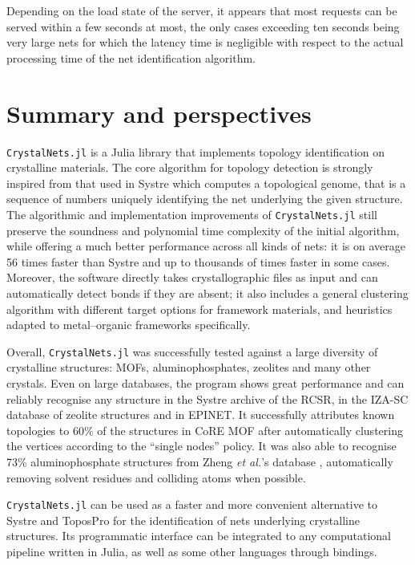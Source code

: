 \documentclass[main.tex]{subfiles}
\begin{document}
Depending on the load state of the server, it appears that most requests can be served within a few seconds at most, the only cases exceeding ten seconds being very large nets for which the latency time is negligible with respect to the actual processing time of the net identification algorithm.

\section{Summary and perspectives}

\texttt{CrystalNets.jl} is a Julia library that implements topology identification on crystalline materials. The core algorithm for topology detection is strongly inspired from that used in Systre \autocite{Systre} which computes a topological genome, that is a sequence of numbers uniquely identifying the net underlying the given structure. The algorithmic and implementation improvements of \texttt{CrystalNets.jl} still preserve the soundness and polynomial time complexity of the initial algorithm, while offering a much better performance across all kinds of nets: it is on average 56 times faster than Systre and up to thousands of times faster in some cases. Moreover, the software directly takes crystallographic files as input and can automatically detect bonds if they are absent; it also includes a general clustering algorithm with different target options for framework materials, and heuristics adapted to metal--organic frameworks specifically.

Overall, \texttt{CrystalNets.jl} was successfully tested against a large diversity of crystalline structures: MOFs, aluminophosphates, zeolites and many other crystals. Even on large databases, the program shows great performance and can reliably recognise any structure in the Systre archive of the RCSR, in the IZA-SC database of zeolite structures and in EPINET. It successfully attributes known topologies to {60\%} of the structures in CoRE MOF after automatically clustering the vertices according to the ``single nodes'' policy. It was also able to recognise {73\%} aluminophosphate structures from Zheng \textit{et al.}'s database \autocite{ALPO}, automatically removing solvent residues and colliding atoms when possible.

\texttt{CrystalNets.jl} can be used as a faster and more convenient alternative to Systre and ToposPro for the identification of nets underlying crystalline structures. Its programmatic interface can be integrated to any computational pipeline written in Julia, as well as some other languages through bindings. %
\end{document}
